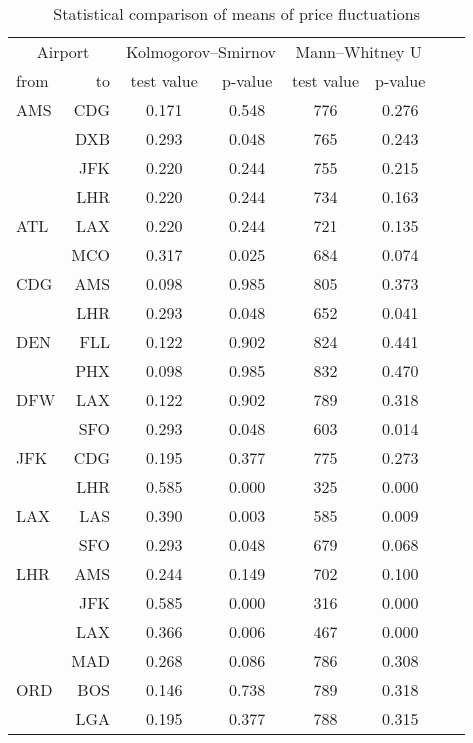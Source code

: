 \begin{table}[h]
    \begin{center}
        \begin{tabular}{l r c c c c c c}
            \toprule
            \multicolumn{2}{c}{Airport}  &  \multicolumn{2}{c}{Kolmogorov--Smirnov} & \multicolumn{2}{c}{Mann--Whitney U} \\[.4ex]
            from  &  to  &  test value   &  p-value  & test value  &  p-value  \\
\midrule
AMS  &  CDG  &  0.171  &  0.548  &  776  &  0.276  \\
~    &  DXB  &  0.293  &  0.048  &  765  &  0.243  \\
~    &  JFK  &  0.220  &  0.244  &  755  &  0.215  \\
~    &  LHR  &  0.220  &  0.244  &  734  &  0.163  \\[.5ex]
ATL  &  LAX  &  0.220  &  0.244  &  721  &  0.135  \\
~    &  MCO  &  0.317  &  0.025  &  684  &  0.074  \\[.5ex]
CDG  &  AMS  &  0.098  &  0.985  &  805  &  0.373  \\
~    &  LHR  &  0.293  &  0.048  &  652  &  0.041  \\[.5ex]
DEN  &  FLL  &  0.122  &  0.902  &  824  &  0.441  \\
~    &  PHX  &  0.098  &  0.985  &  832  &  0.470  \\[.5ex]
DFW  &  LAX  &  0.122  &  0.902  &  789  &  0.318  \\
~    &  SFO  &  0.293  &  0.048  &  603  &  0.014  \\[.5ex]
JFK  &  CDG  &  0.195  &  0.377  &  775  &  0.273  \\
~    &  LHR  &  0.585  &  0.000  &  325  &  0.000  \\[.5ex]
LAX  &  LAS  &  0.390  &  0.003  &  585  &  0.009  \\
~    &  SFO  &  0.293  &  0.048  &  679  &  0.068  \\[.5ex]
LHR  &  AMS  &  0.244  &  0.149  &  702  &  0.100  \\
~    &  JFK  &  0.585  &  0.000  &  316  &  0.000  \\
~    &  LAX  &  0.366  &  0.006  &  467  &  0.000  \\
~    &  MAD  &  0.268  &  0.086  &  786  &  0.308  \\[.5ex]
ORD  &  BOS  &  0.146  &  0.738  &  789  &  0.318  \\
~    &  LGA  &  0.195  &  0.377  &  788  &  0.315  \\
            \bottomrule
        \end{tabular}
        \caption{Statistical comparison of means of price fluctuations}
        \label{tbl:StatisicalComparison}
    \end{center}
\end{table}


